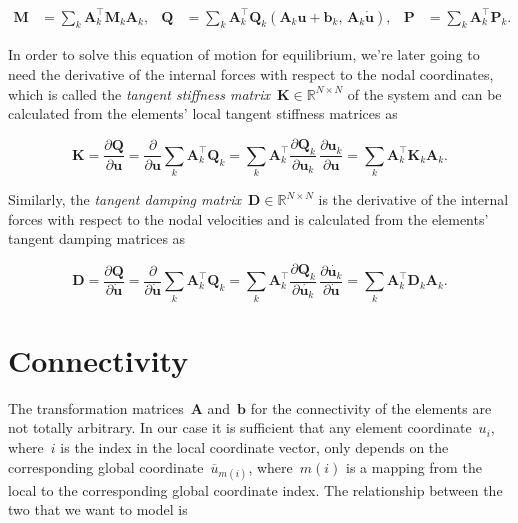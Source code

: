 \begin{align}
\boldsymbol{M} &= \sum_{k} \boldsymbol{A}_{k}^\intercal\boldsymbol{M}_{k}\boldsymbol{A}_{k}, & \boldsymbol{Q} &= \sum_{k} \boldsymbol{A}_{k}^\intercal\boldsymbol{Q}_{k}(\boldsymbol{A}_{k}\boldsymbol{u} + \boldsymbol{b}_{k},\,\boldsymbol{A}_{k}\dot{\boldsymbol{u}}), & \boldsymbol{P} &= \sum_{k} \boldsymbol{A}_{k}^\intercal\boldsymbol{P}_{k}.
\end{align}

In order to solve this equation of motion for equilibrium, we're later going to need the derivative of the internal forces with respect to the nodal coordinates, which is called the \textit{tangent stiffness matrix}~$\boldsymbol{K} \in \mathbb{R}^{N \times N}$ of the system and can be calculated from the elements' local tangent stiffness matrices as

\begin{equation}
\boldsymbol{K} = \frac{\partial \boldsymbol{Q}}{\partial \boldsymbol{u}} = \frac{\partial}{\partial \boldsymbol{u}} \sum_{k} \boldsymbol{A}_{k}^\intercal\boldsymbol{Q}_{k} = \sum_{k} \boldsymbol{A}_{k}^\intercal \frac{\partial \boldsymbol{Q}_{k}}{\partial \boldsymbol{u}_{k}}\,\frac{\partial \boldsymbol{u}_{k}}{\partial \boldsymbol{u}} = \sum_{k} \boldsymbol{A}_{k}^\intercal \boldsymbol{K}_{k} \boldsymbol{A}_{k}.
\end{equation}

Similarly, the \textit{tangent damping matrix}~$\boldsymbol{D} \in \mathbb{R}^{N \times N}$ is the derivative of the internal forces with respect to the nodal velocities and is calculated from the elements' tangent damping matrices as 

\begin{equation}
\boldsymbol{D} = \frac{\partial \boldsymbol{Q}}{\partial \dot{\boldsymbol{u}}} = \frac{\partial}{\partial \dot{\boldsymbol{u}}} \sum_{k} \boldsymbol{A}_{k}^\intercal\boldsymbol{Q}_{k} = \sum_{k} \boldsymbol{A}_{k}^\intercal \frac{\partial \boldsymbol{Q}_{k}}{\partial \dot{\boldsymbol{u}_{k}}}\,\frac{\partial \dot{\boldsymbol{u}_{k}}}{\partial \dot{\boldsymbol{u}}} = \sum_{k} \boldsymbol{A}_{k}^\intercal \boldsymbol{D}_{k} \boldsymbol{A}_{k}.
\end{equation}

\section{Connectivity}

The transformation matrices~$\boldsymbol{A}$ and~$\boldsymbol{b}$ for the connectivity of the elements are not totally arbitrary.
In our case it is sufficient that any element coordinate~$u_{i}$, where~$i$ is the index in the local coordinate vector, only depends on the corresponding global coordinate~$\overline{u}_{m(i)}$, where~$m(i)$ is a mapping from the local to the corresponding global coordinate index.
The relationship between the two that we want to model is

